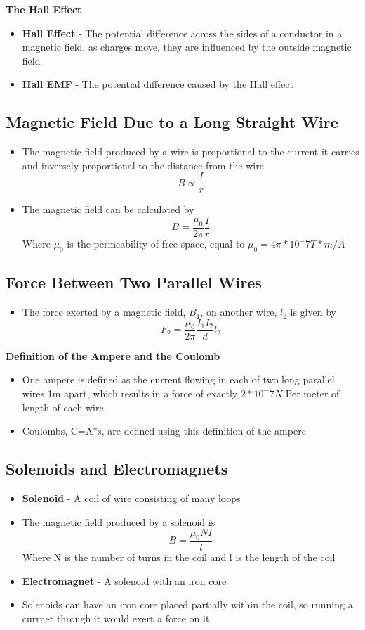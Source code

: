 \textbf{The Hall Effect}
\begin{itemize}
    \item \textbf{Hall Effect} - The potential difference across the sides of a conductor in a magnetic field, as charges move, they are influenced by the outside magnetic field
    \item \textbf{Hall EMF} - The potential difference caused by the Hall effect
\end{itemize}

\subsection{Magnetic Field Due to a Long Straight Wire}
\begin{itemize}
    \item The magnetic field produced by a wire is proportional to the current it carries and inversely proportional to the distance from the wire \[B\propto\frac{I}{r}\]
    \item The magnetic field can be calculated by \[B=\frac{\mu_0}{2\pi}\frac{I}{r}\] Where \(\mu_0\) is the permeability of free space, equal to \(\mu_0=4\pi*10^-7T*m/A\)
\end{itemize}

\subsection{Force Between Two Parallel Wires}
\begin{itemize}
    \item The force exerted by a magnetic field, \(B_1\), on another wire, \(l_2\) is given by \[F_2=\frac{\mu_0}{2\pi}\frac{I_1I_2}{d}l_2\]
\end{itemize}

\textbf{Definition of the Ampere and the Coulomb}
\begin{itemize}
    \item One ampere is defined as the current flowing in each of two long parallel wires 1m apart, which results in a force of exactly \(2*10^-7N\) Per meter of length of each wire
    \item Coulombs, C=A*s, are defined using this definition of the ampere
\end{itemize}

\subsection{Solenoids and Electromagnets}
\begin{itemize}
    \item \textbf{Solenoid} - A coil of wire consisting of many loops
    \item The magnetic field produced by a solenoid is \[B=\frac{\mu_0NI}{l}\] Where N is  the number of turns in the coil and l is the length of the coil
    \item \textbf{Electromagnet} - A solenoid with an iron core
    \item Solenoids can have an iron core placed partially within the coil, so running a currnet through it would exert a force on it
\end{itemize}

